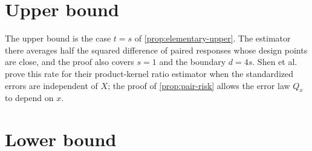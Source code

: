 \section{Upper bound}
The upper bound is the case $t=s$ of
\cref{prop:elementary-upper}. The estimator there averages half the
squared difference of paired responses whose design points are close,
and the proof also covers $s=1$ and the boundary $d=4s$. Shen et al.\
\cite[Section~4.1, Proposition~1]{ShenGaoWittenHan2020} prove this rate
for their product-kernel ratio estimator when the standardized errors
are independent of $X$; the proof of \cref{prop:pair-risk} allows the
error law $Q_x$ to depend on $x$.

\section{Lower bound}

